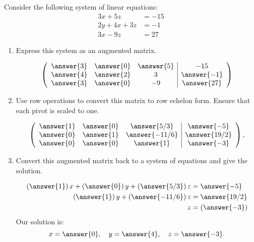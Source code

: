 \documentclass{ximera}
\begin{document}
\begin{exercise}
Consider the following system of linear equations:
\begin{align*}
      3x + 5z &=  -15 \\
     2y+4x+3z&= -1\\
     3x -9z&= 27
\end{align*}
\begin{enumerate}
\item Express this system as an augmented matrix.
\begin{prompt}
\[
\left(\begin{array}{ccc|c}
  \answer{3} &  \answer{0} & \answer{5} &-15 \\
  \answer{4} & \answer{2} & 3 & \answer{-1} \\
  \answer{3} &  \answer{0} & -9 & \answer{27}
\end{array}\right)
\]
\end{prompt}
\item Use row operations to convert this matrix to row echelon form.
  Ensure that each pivot is scaled to one.
\begin{prompt}
\[
\left(\begin{array}{ccc|c}
  \answer{1} &  \answer{0} & \answer{5/3} &\answer{-5} \\
  \answer{0} & \answer{1} & \answer{-11/6} & \answer{19/2} \\
  \answer{0} &  \answer{0} & \answer{1} & \answer{-3}
\end{array}\right),
\]
\end{prompt}
\item Convert this augmented matrix back to a system of equations
and give the solution.
\begin{prompt}
\begin{align*}
      \left(\answer{1}\right)x + \left(\answer{0}\right)y + \left(\answer{5/3}\right)z &= \answer{-5} \\
     \left(\answer{1}\right)y+\left(\answer{-11/6}\right)z&=\answer{19/2}\\
     z&=\left(\answer{-3}\right)
\end{align*}
Our solution is:
\[
x= \answer{0}, \quad y= \answer{4}, \quad z=\answer{-3}.
\]
\end{prompt}
\end{enumerate}
\end{exercise}
\end{document}
